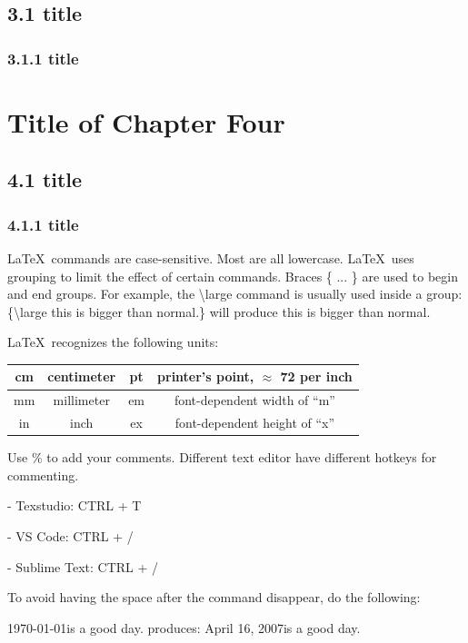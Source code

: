 \documentclass[a4paper,11pt,UTF8,openright]{book}
\begin{document}
\section{3.1 title}
\lipsum[1-5]

\subsection{3.1.1 title}
\lipsum[1-3]

\chapter{Title of Chapter Four}
\lipsum[1-2]

\section{4.1 title}
\lipsum[1-3]

\subsection{4.1.1 title}

\LaTeX\ commands are case-sensitive. Most are all lowercase. \LaTeX\ uses grouping to limit the effect of certain commands. Braces \{ ... \} are used to begin and end groups. For example, the
\textbackslash large command is usually used inside a group: \{\textbackslash large this is bigger than normal.\}  will produce {\large this is bigger than normal.} 

\LaTeX\ recognizes the following units:
\vskip 0.2in
\begin{tabular}{|c|c||c|c|}
	\hline 
	cm & centimeter & pt & printer’s point, $\approx$ 72 per inch \\ \hline
	mm & millimeter & em & font-dependent width of “m” \\ 	\hline
	in & inch & ex & font-dependent height of “x” \\ 	\hline
\end{tabular}
\vskip 0.2in

Use \% to add your comments. Different text editor have different hotkeys for commenting.

- Texstudio: CTRL + T

- VS Code: CTRL + /

- Sublime Text: CTRL + /

To avoid having the space after the command disappear, do the following:

\today is a good day. produces: April 16, 2007is a good day.
\end{document}
